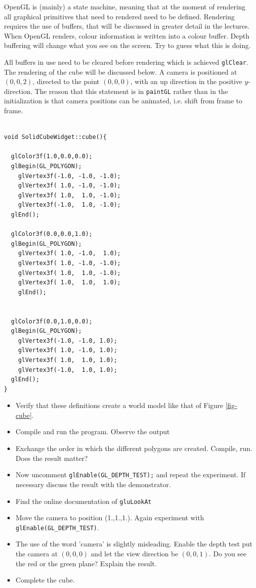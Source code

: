 \documentclass[a4wide]{article}
\begin{document}
OpenGL is (mainly) a state machine, meaning that at the moment of rendering all graphical primitives that need to rendered need to be defined. Rendering requires the
use of buffers, that will be discussed in greater detail in the lectures. When OpenGL renders, colour information is written into a colour buffer. Depth buffering
will change what you see on the screen. Try to guess what this is doing.

All buffers in use need to be cleared before rendering which is achieved \texttt{glClear}. The rendering of the cube will be discussed below.  A camera is positioned
at $(0,0,2)$, directed to the point $(0,0,0)$, with an up direction in the positive $y$-direction. The reason that this statement is in \texttt{paintGL} rather than in the 
initialization is that camera positions can be animated, i.e. shift from frame to frame.

\begin{lstlisting}

void SolidCubeWidget::cube(){

  glColor3f(1.0,0.0,0.0);
  glBegin(GL_POLYGON);
    glVertex3f(-1.0, -1.0, -1.0);
    glVertex3f( 1.0, -1.0, -1.0);
    glVertex3f( 1.0,  1.0, -1.0);
    glVertex3f(-1.0,  1.0, -1.0);
  glEnd();

  glColor3f(0.0,0.0,1.0);
  glBegin(GL_POLYGON);
    glVertex3f( 1.0, -1.0,  1.0);
    glVertex3f( 1.0, -1.0, -1.0);
    glVertex3f( 1.0,  1.0, -1.0);
    glVertex3f( 1.0,  1.0,  1.0);
    glEnd();


  glColor3f(0.0,1.0,0.0);
  glBegin(GL_POLYGON);
    glVertex3f(-1.0, -1.0, 1.0);
    glVertex3f( 1.0, -1.0, 1.0);
    glVertex3f( 1.0,  1.0, 1.0);
    glVertex3f(-1.0,  1.0, 1.0);
  glEnd();
}
\end{lstlisting}


\begin{itemize}
  \item Verify that these definitions create a world model like that of Figure \ref{fig-cube}.
  \item Compile and run the program. Observe the output
  \item Exchange the order in which the different polygons are created. Compile, run.  Does the result matter?
  \item Now uncomment \texttt{glEnable(GL\_DEPTH\_TEST);} and repeat the experiment. If necessary discuss the result with the demonstrator.
  \item Find the online documentation of \texttt{gluLookAt}
  \item Move the camera to position (1.,1.,1.). Again experiment with  \texttt{glEnable(GL\_DEPTH\_TEST)}.
  \item The use of the word 'camera' is slightly misleading. Enable the depth test put the camera at $(0,0,0)$ and let the view direction be $(0,0,1)$. Do you see the red or the green plane? Explain the result.
  \item Complete the cube.
\end{itemize}
\end{document}
